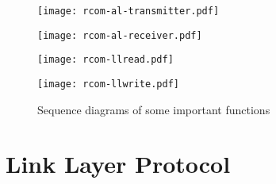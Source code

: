\documentclass[main.tex]{subfiles}
\begin{document}
\begin{figure}[ph]
\caption{Sequence diagrams of some important functions\label{fig:seqdiagrams}}
	
\begin{minipage}{0.5\textwidth}
\centering
\texttt{[image: rcom-al-transmitter.pdf]}
\end{minipage}
\begin{minipage}{0.5\textwidth}
\centering
\texttt{[image: rcom-al-receiver.pdf]}
\end{minipage}
\begin{minipage}{0.5\textwidth}
\centering
\texttt{[image: rcom-llread.pdf]}
\end{minipage}
\begin{minipage}{0.5\textwidth}
\centering
\texttt{[image: rcom-llwrite.pdf]}
\end{minipage}
\end{figure}

\section{Link Layer Protocol}
\label{sec:llprotocol}
\end{document}
